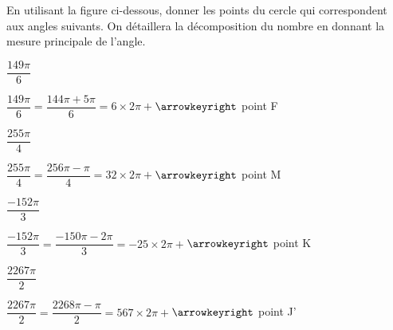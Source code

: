 \documentclass[11pt,a4paper]{article}  %
\begin{document}
En utilisant la figure ci-dessous, donner les points du cercle qui correspondent aux angles suivants. On détaillera la décomposition du nombre en donnant la mesure principale de l'angle.
	\begin{enumMet}
		\item $\dfrac{149\pi}{6}$
		\begin{corrBox}
			$\dfrac{149\pi}{6}=\dfrac{144\pi+5\pi}{6}=6\times 2\pi+$\quad $\arrowkeyright$ point F
		\end{corrBox}
		\item $\dfrac{255\pi}{4}$
		\begin{corrBox}
			$\dfrac{255\pi}{4}=\dfrac{256\pi-\pi}{4}=32\times 2\pi+$\quad $\arrowkeyright$ point M
		\end{corrBox}
		\item $\dfrac{-152\pi}{3}$ 
		\begin{corrBox}
			$\dfrac{-152\pi}{3}=\dfrac{-150\pi-2\pi}{3}=-25\times 2\pi+$\quad $\arrowkeyright$ point K
		\end{corrBox}
		\item {} $\dfrac{2267\pi}{2}$
		\begin{corrBox}
			$\dfrac{2267\pi}{2}=\dfrac{2268\pi-\pi}{2}=567\times 2\pi+$\quad $\arrowkeyright$ point J'
		\end{corrBox}
	\end{enumMet}
\ \\
\end{document}
